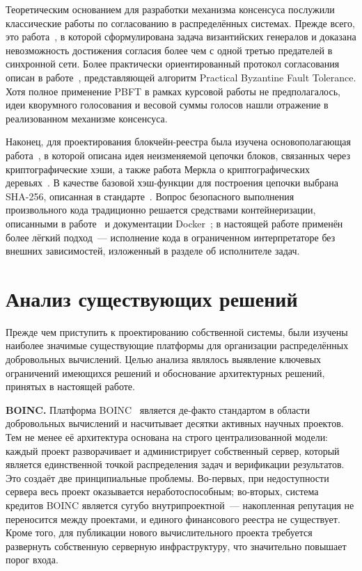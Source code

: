 \documentclass[a4paper,11pt]{extarticle}
\begin{document}
Теоретическим основанием для разработки механизма консенсуса послужили
классические работы по согласованию в распределённых системах. Прежде всего,
это работа~\cite{byzantine_generals}, в которой сформулирована задача
византийских генералов и доказана невозможность достижения согласия более чем
с одной третью предателей в синхронной сети. Более практически ориентированный
протокол согласования описан в работе~\cite{pbft}, представляющей алгоритм
Practical Byzantine Fault Tolerance. Хотя полное применение PBFT в рамках
курсовой работы не предполагалось, идеи кворумного голосования и весовой суммы
голосов нашли отражение в реализованном механизме консенсуса.

Наконец, для проектирования блокчейн-реестра была изучена основополагающая
работа~\cite{nakamoto_bitcoin}, в которой описана идея неизменяемой цепочки
блоков, связанных через криптографические хэши, а также работа Меркла о
криптографических деревьях~\cite{merkle_1979}. В качестве базовой хэш-функции
для построения цепочки выбрана SHA-256, описанная в стандарте~\cite{fips_180_4}.
Вопрос безопасного выполнения произвольного кода традиционно решается средствами
контейнеризации, описанными в работе~\cite{merkel_docker} и документации
Docker~\cite{docker_docs}; в настоящей работе применён более лёгкий подход~---
исполнение кода в ограниченном интерпретаторе без внешних зависимостей,
изложенный в разделе об исполнителе задач.

\section{Анализ существующих решений}

Прежде чем приступить к проектированию собственной системы, были изучены
наиболее значимые существующие платформы для организации распределённых
добровольных вычислений. Целью анализа являлось выявление ключевых ограничений
имеющихся решений и обоснование архитектурных решений, принятых в настоящей
работе.

\textbf{BOINC.} Платформа BOINC~\cite{boincwebsite, anderson_boinc} является
де-факто стандартом в области добровольных вычислений и насчитывает десятки
активных научных проектов. Тем не менее её архитектура основана на строго
централизованной модели: каждый проект разворачивает и администрирует
собственный сервер, который является единственной точкой распределения задач и
верификации результатов. Это создаёт две принципиальные проблемы. Во-первых,
при недоступности сервера весь проект оказывается неработоспособным; во-вторых,
система кредитов BOINC является сугубо внутрипроектной~--- накопленная репутация
не переносится между проектами, и единого финансового реестра не существует.
Кроме того, для публикации нового вычислительного проекта требуется развернуть
собственную серверную инфраструктуру, что значительно повышает порог входа.
\end{document}
